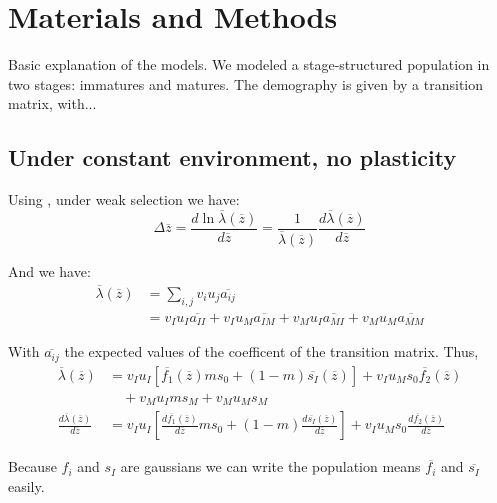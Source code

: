 \label{sec:M&M}
\section*{Materials and Methods}

Basic explanation of the models. We modeled a stage-structured population in two stages: immatures and matures. The demography is given by a transition matrix, with...

\subsection*{Under constant environment, no plasticity}

Using \citet{lande_adaptation_2009}, under weak selection we have:
\begin{equation}
	\label{eq:dz}
	\Delta\overline{z} = \frac{d\ln\overline{\lambda}(\overline{z})}{d\overline{z}} = \frac{1}{\overline{\lambda}(\overline{z})} \frac{d\overline{\lambda}(\overline{z})}{d\overline{z}}
\end{equation}

And we have:
\begin{align*}
	\overline{\lambda}(\overline{z}) &= \sum_{i,j}{v_{i} u_{j} \overline{a_{ij}}} \\
	&= v_{I} u_{I} \overline{a_{II}} + v_{I} u_{M} \overline{a_{IM}} + v_{M} u_{I} \overline{a_{MI}} + v_{M} u_{M} \overline{a_{MM}}
\end{align*}

With $\overline{a_{ij}}$ the expected values of the coefficent of the transition matrix. Thus,
\begin{align}
	\overline{\lambda}(\overline{z}) &= v_{I} u_{I} \left[ \overline{f_{1}}(\overline{z}) m s_{0} + (1-m) \overline{s_{I}}(\overline{z}) \right] + v_{I} u_{M} s_{0} \overline{f_{2}}(\overline{z}) \nonumber \\
	&\quad + v_{M} u_{I} m s_{M} + v_{M} u_{M} s_M \\
	\label{eq:dlambda}
	\frac{d\overline{\lambda}(\overline{z})}{d\overline{z}} &= v_{I} u_{I} \left[ \frac{d\overline{f_{1}}(\overline{z})}{d\overline{z}} m s_{0} + (1-m) \frac{d\overline{s_{I}}(\overline{z})}{d\overline{z}} \right] + v_{I} u_{M} s_{0} \frac{d\overline{f_{2}}(\overline{z})}{d\overline{z}}
\end{align}

Because $f_{i}$ and $s_{I}$ are gaussians we can write the population means $\overline{f_{i}}$ and $\overline{s_{I}}$ easily.

